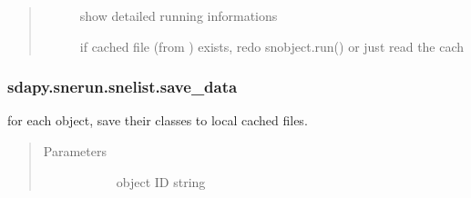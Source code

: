 \documentclass[letterpaper,10pt,english]{sphinxmanual}
\begin{document}
\begin{fulllineitems}
\begin{fulllineitems}
\begin{quote}
\begin{description}
\begin{description}
\item[{}] \leavevmode{[}\sphinxtitleref{bool}{]}
show detailed running informations

\item[{}] \leavevmode{[}\sphinxtitleref{bool}{]}
if cached file (from ) exists, redo snobject.run() or just read the cach

\end{description}

\end{description}\end{quote}



\begin{description}
\item[{{\hyperref[\detokenize{generated/sdapy.snerun.snobject.run:sdapy.snerun.snobject.run}]{}}}] \leavevmode
\end{description}



\end{fulllineitems}



\subsubsection{sdapy.snerun.snelist.save\_data}
\label{\detokenize{generated/sdapy.snerun.snelist.save_data:sdapy-snerun-snelist-save-data}}\label{\detokenize{generated/sdapy.snerun.snelist.save_data::doc}}

\begin{fulllineitems}
\label{\detokenize{generated/sdapy.snerun.snelist.save_data:sdapy.snerun.snelist.save_data}}
for each object, save their  classes to local cached files.
\begin{quote}\begin{description}
\item[{Parameters}] \leavevmode\begin{description}
\item[{}] \leavevmode{[}\sphinxtitleref{str}{]}
object ID string


\end{description}
\end{description}
\end{quote}
\end{fulllineitems}
\end{fulllineitems}
\end{document}
